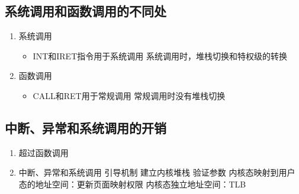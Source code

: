 \subsection{系统调用和函数调用的不同处}
\begin{enumerate}
	\item 系统调用
	\begin{itemize}
		\item INT和IRET指令用于系统调用
		\subitem 系统调用时，堆栈切换和特权级的转换
	\end{itemize}
\item 函数调用
\begin{itemize}
	\item CALL和RET用于常规调用
	\subitem 常规调用时没有堆栈切换
\end{itemize}
\end{enumerate}
\subsection{中断、异常和系统调用的开销}
\begin{enumerate}
	\item 超过函数调用
	\item 中断、异常和系统调用
	\subitem 引导机制
	\subitem 建立内核堆栈
	\subitem 验证参数
	\subitem 内核态映射到用户态的地址空间：更新页面映射权限
	\subitem 内核态独立地址空间：TLB
\end{enumerate}
